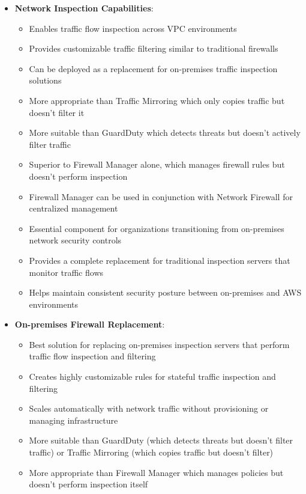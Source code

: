 \documentclass[11pt,a4paper]{report}
\begin{document}
\begin{itemize}
\begin{itemize}
\end{itemize}
  \item \textbf{Network Inspection Capabilities}:
\begin{itemize}
  \item Enables traffic flow inspection across VPC environments
  \item Provides customizable traffic filtering similar to traditional firewalls
  \item Can be deployed as a replacement for on-premises traffic inspection solutions
  \item More appropriate than Traffic Mirroring which only copies traffic but doesn't filter it
  \item More suitable than GuardDuty which detects threats but doesn't actively filter traffic
  \item Superior to Firewall Manager alone, which manages firewall rules but doesn't perform inspection
  \item Firewall Manager can be used in conjunction with Network Firewall for centralized management
  \item Essential component for organizations transitioning from on-premises network security controls
  \item Provides a complete replacement for traditional inspection servers that monitor traffic flows
  \item Helps maintain consistent security posture between on-premises and AWS environments
\end{itemize}
  \item \textbf{On-premises Firewall Replacement}:
\begin{itemize}
  \item Best solution for replacing on-premises inspection servers that perform traffic flow inspection and filtering
  \item Creates highly customizable rules for stateful traffic inspection and filtering
  \item Scales automatically with network traffic without provisioning or managing infrastructure
  \item More suitable than GuardDuty (which detects threats but doesn't filter traffic) or Traffic Mirroring (which copies traffic but doesn't filter)
  \item More appropriate than Firewall Manager which manages policies but doesn't perform inspection itself
\end{itemize}
\end{itemize}
\end{document}
